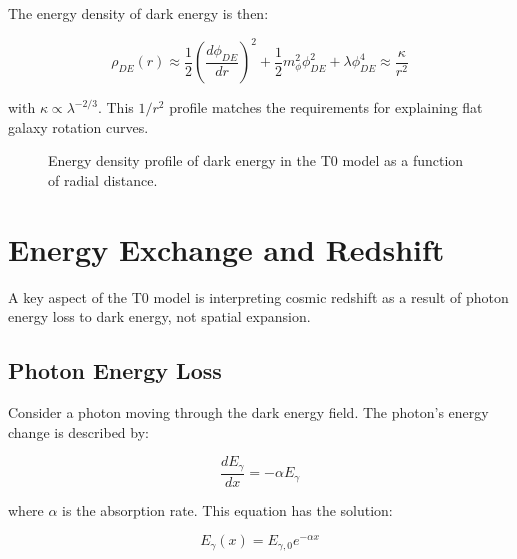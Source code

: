 \documentclass[a4paper,12pt]{article}
\theoremstyle{definition}
\theoremstyle{remark}
\begin{document}
	The energy density of dark energy is then:
	
	\begin{equation}
		\rho_{DE}(r) \approx \frac{1}{2}\left(\frac{d\phi_{DE}}{dr}\right)^2 + \frac{1}{2}m_{\phi}^2\phi_{DE}^2 + \lambda\phi_{DE}^4 \approx \frac{\kappa}{r^2}
	\end{equation}
	
	with $\kappa \propto \lambda^{-2/3}$. This $1/r^2$ profile matches the requirements for explaining flat galaxy rotation curves.
	
	\begin{figure}[h]
		\centering
		\caption{Energy density profile of dark energy in the T0 model as a function of radial distance.}
	\end{figure}
	
	\section{Energy Exchange and Redshift}
	A key aspect of the T0 model is interpreting cosmic redshift as a result of photon energy loss to dark energy, not spatial expansion.
	
	\subsection{Photon Energy Loss}
	Consider a photon moving through the dark energy field. The photon’s energy change is described by:
	
	\begin{equation}
		\frac{dE_{\gamma}}{dx} = -\alpha E_{\gamma}
	\end{equation}
	
	where $\alpha$ is the absorption rate. This equation has the solution:
	
	\begin{equation}
		E_{\gamma}(x) = E_{\gamma,0} e^{-\alpha x}
	\end{equation}
	
\end{document}
